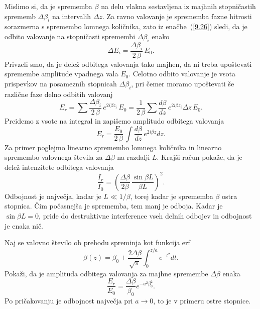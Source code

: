 Mislimo si, da je sprememba $\beta$ na delu vlakna sestavljena iz
majhnih stopničastih sprememb $\Delta\beta_{i}$ na intervalih $\Delta z$.
Za ravno valovanje je sprememba fazne hitrosti sorazmerna s spremembo
lomnega količnika, zato iz enačbe~(\ref{9.26}) sledi, da je odbito valovanje
na stopničasti spremembi $\Delta\beta_{i}$ enako
\begin{equation}
\Delta E_{i}=\frac{\Delta\beta_{i}}{2\,\beta}\, E_{0}.
\label{9.27}
\end{equation}
Privzeli smo, da je delež odbitega valovanja tako majhen, da ni treba upoštevati 
spremembe amplitude vpadnega vala $E_{0}$. Celotno odbito valovanje je vsota 
prispevkov na posameznih stopnicah $\Delta\beta_{i}$,
pri čemer moramo upoštevati še različne faze delno odbitih valovanj
\begin{equation}
E_{r}=\sum\frac{\Delta\beta_{i}}{2\,\beta}\, e^{2i\beta z_{i}}\, 
E_{0}=\frac{1}{2\,\beta}\sum\frac{d\beta}{dz}\, e^{2i\beta z_{i}}\Delta z\, E_{0}.
\label{9.28}
\end{equation}
Preidemo z vsote na integral in zapišemo amplitudo odbitega valovanja
\begin{equation}
E_{r}=\frac{E_{0}}{2\,\beta}\,\int\frac{d\beta}{dz}\, e^{2i\beta z}dz.
\label{9.29}
\end{equation}
Za primer poglejmo linearno spremembo lomnega količnika in linearno spremembo 
valovnega števila za $\Delta\beta$ na razdalji $L$. Krajši račun pokaže, da je 
delež intenzitete odbitega valovanja 
\begin{equation}
\frac{I_{r}}{I_{0}}=\left( \frac{\Delta\beta}{2 \beta}\,\frac{\sin\beta L}{\beta L}\right)^2.
\label{9.30}
\end{equation}
Odbojnost je največja, kadar je $L \ll 1/\beta$,
torej kadar je sprememba $\beta$ ostra stopnica. Čim počasnejša je
sprememba, tem manj je odboja. Kadar je $\sin\beta L=0$, pride do destruktivne 
interference vseh delnih odbojev in odbojnost je enaka nič.

\begin{definition}
Naj se valovno število ob prehodu spreminja kot funkcija erf
\begin{equation}
\beta (z)= \beta_0 + \frac{2\Delta \beta}{\sqrt{\pi}} \int_0^{z/a} e^{-t^2}dt.
\end{equation}
Pokaži, da je amplituda 
odbitega valovanja za majhne spremembe $\Delta \beta$ enaka
\begin{equation}
\frac{E_r}{E_0} = \frac{\Delta \beta}{\beta_0}e^{-a^2\beta_0^2}.
\end{equation}
Po pričakovanju je odbojnost največja pri $a\to 0$, to je v primeru ostre stopnice.
\end{definition}

